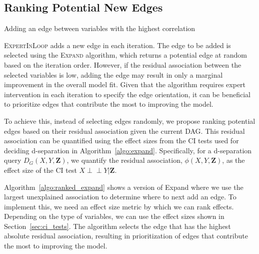 \documentclass{uai2025} %
\def\ci{\perp\!\!\!\!\perp}
\begin{document}
\subsection{Ranking Potential New Edges}
\label{sec:ranking}

\begin{algorithm}[h]
\DontPrintSemicolon
\SetAlgoLined
{}
\caption{Adding an edge between variables with the highest correlation}
\label{algo:ranked_expand}
\end{algorithm}

\textsc{ExpertInLoop} adds a new edge in each iteration. The edge
to be added is selected using the \textsc{Expand} algorithm, which 
returns a potential edge at random based on the iteration order. 
However, if the residual association between the selected variables 
is low, adding the edge may result in only a marginal improvement 
in the overall model fit. Given that the
algorithm requires expert intervention in each iteration to specify the edge
orientation, it can be beneficial to prioritize edges that contribute 
the most to improving the model.

To achieve this, instead of selecting edges randomly, we propose ranking
potential edges based on their residual association given the current DAG. This
residual association can be quantified using the effect sizes from the
CI tests used for deciding d-separation in Algorithm~\ref{algo:expand}.
Specifically, for a d-separation query $D_G(X, Y, \mathbf{Z}) $, we quantify
the residual association, $ \phi(X, Y, \bm{Z}) $, as the effect size of the CI
test $X \ci Y \rvert \bm{Z} $. 

Algorithm~\ref{algo:ranked_expand} shows a 
version of {\sc Expand} where we use the largest unexplained association to
determine where to next add an edge. 
To implement this, we need an effect size
metric by which we can rank effects. Depending on the type of variables, 
we can use the effect sizes shown in Section~\ref{sec:ci_tests}. 
The algorithm selects the edge that has the highest absolute residual 
association, resulting
in prioritization of edges that contribute the most to improving the model.
\end{document}
